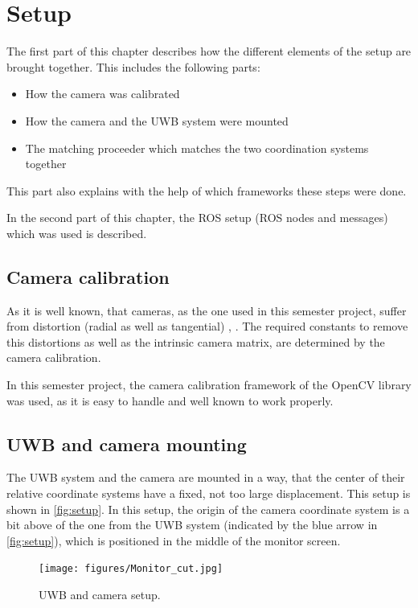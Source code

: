 
\setcounter{chapter}{2}

\chapter{Setup}\label{ch:setup}
The first part of this chapter describes how the different elements of the setup are brought together. This includes the following parts:
\begin{itemize}
	\item How the camera was calibrated
	\item How the camera and the \ac{UWB} system were mounted
	\item The matching proceeder which matches the two coordination systems together
\end{itemize}
This part also explains with the help of which frameworks these steps were done.

In the second part of this chapter, the \ac{ROS} setup (\ac{ROS} nodes and messages) which was used is described. 

\section{Camera calibration}
As it is well known, that cameras, as the one used in this semester project, suffer from distortion (radial as well as tangential) \cite{Szeliski:2010:CVA:1941882}, \cite{opencv_library}. The required constants to remove this distortions as well as the intrinsic camera matrix, are determined by the camera calibration.

In this semester project, the camera calibration framework of the OpenCV library \cite{opencv_library} was used, as it is easy to handle and well known to work properly.

\section{\ac{UWB} and camera mounting}
The \ac{UWB} system and the camera are mounted in a way, that the center of their relative coordinate systems have a fixed, not too large displacement. This setup is shown in \autoref{fig:setup}. In this setup, the origin of the camera coordinate system is a bit above of the one from the \ac{UWB} system (indicated by the blue arrow in \autoref{fig:setup}), which is positioned in the middle of the monitor screen. 

\begin{figure}[h]\centering
	\texttt{[image: figures/Monitor\_cut.jpg]}
	\caption{\ac{UWB} and camera setup.}\label{fig:setup}
\end{figure}

